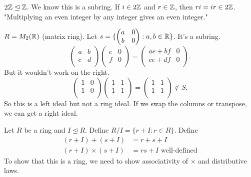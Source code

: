 \documentclass[class=article,crop=false]{standalone}
\begin{document}
\begin{eg}[]
$ 2 \mathbb{Z} \trianglelefteq \mathbb{Z}$. We know this is a subring. If $ i \in 2 \mathbb{Z}$ and $ r \in \mathbb{Z}$, then $ ri= ir \in 2\mathbb{Z}$. "Multiplying an even integer by any integer gives an even integer."
\end{eg}

\begin{eg}[]
	$ R=M_2 (\mathbb{R})$ (matrix ring). Let $ s= \{ \begin{pmatrix} a&0\\b&0\\ \end{pmatrix} : a,b \in \mathbb{R} \} $. It's a subring. 
	\[
		\begin{pmatrix} a&b\\c&d\\ \end{pmatrix} \begin{pmatrix} e&0\\f&0\\ \end{pmatrix} = \begin{pmatrix} ae+bf&0\\ce+df&0\\ \end{pmatrix} 
	.\] 
	But it wouldn't work on the right.
	\[
		\begin{pmatrix} 1&0\\1&0\\ \end{pmatrix} \begin{pmatrix} 1&1\\1&1\\ \end{pmatrix}  = \begin{pmatrix} 1&1\\1&1\\ \end{pmatrix} \not\in S
	.\] 
So this is a left ideal but not a ring ideal. If we swap the columns or transpose, we can get a right ideal.
\end{eg}


Let $ R$ be a ring and  $ I \trianglelefteq R$. Define $ R /I = \{r+I : r \in R\} $. Define
\begin{align*}
	(r+I)+(s+I) &= r+s+I\\
	(r+I) \times (s+I) &= rs + I \text{ well-defined} 
\end{align*}
To show that this is a ring, we need to show associativity of $ \times $ and distributive laws.
\end{document}
